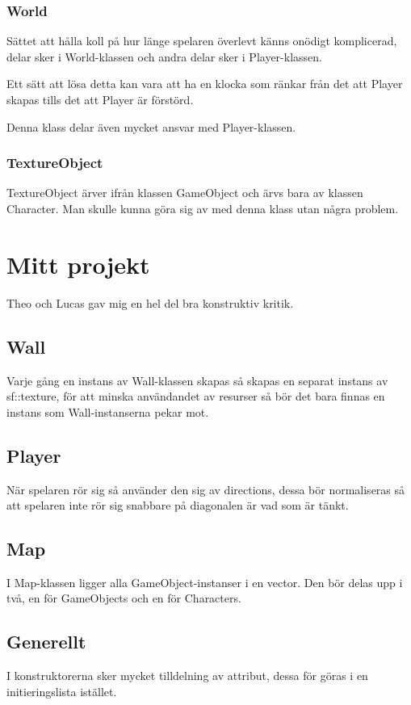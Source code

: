\documentclass{TDP005mall}
\begin{document}
\subsubsection{World}
Sättet att hålla koll på hur länge spelaren överlevt känns onödigt komplicerad, delar sker i World-klassen och andra delar sker i Player-klassen. 

Ett sätt att lösa detta kan vara att ha en klocka som ränkar från det att Player skapas tills det att Player är förstörd. 

Denna klass delar även mycket ansvar med Player-klassen.

\subsubsection{TextureObject}
TextureObject ärver ifrån klassen GameObject och ärvs bara av klassen Character. Man skulle kunna göra sig av med denna klass utan några problem. 

\newpage

\section{Mitt projekt}
Theo och Lucas gav mig en hel del bra konstruktiv kritik.
\subsection{Wall}
Varje gång en instans av Wall-klassen skapas så skapas en separat instans av sf::texture, för att minska användandet av resurser så bör det bara finnas 
en instans som Wall-instanserna pekar mot. 
\subsection{Player}
När spelaren rör sig så använder den sig av directions, dessa bör normaliseras så att spelaren inte rör sig snabbare på diagonalen är vad som är tänkt.
\subsection{Map}
I Map-klassen ligger alla GameObject-instanser i en vector. Den bör delas upp i två, en för GameObjects och en för Characters.
\subsection{Generellt}
I konstruktorerna sker mycket tilldelning av attribut, dessa för göras i en initieringslista istället.
\end{document}
